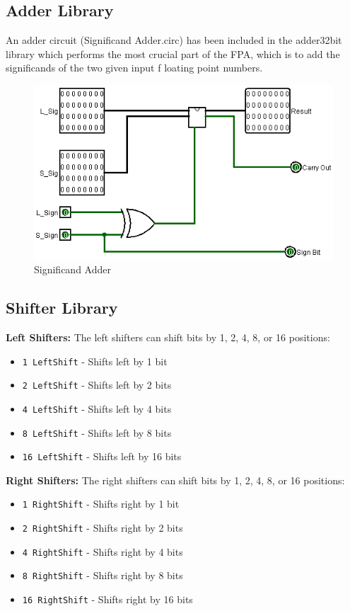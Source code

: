 \documentclass[a4paper,12pt]{article}
\begin{document}
\subsection{Adder Library}
An adder circuit (Significand Adder.circ) has been included in the adder32bit library which performs
 the most crucial part of the FPA, which is to add the significands of the two given input
 f
 loating point numbers.
\begin{figure}[htbp]
    \centering
    \includegraphics[width=1\textwidth]{Significand Adder.png}
    \caption{Significand Adder}
    \label{Significand Adder}
\end{figure}


\subsection{Shifter Library}


\item[\textbf{Left Shifters:}] The left shifters can shift bits by 1, 2, 4, 8, or 16 positions:
        \begin{itemize}
            \item \texttt{1 LeftShift} - Shifts left by 1 bit
            \item \texttt{2 LeftShift} - Shifts left by 2 bits
            \item \texttt{4 LeftShift} - Shifts left by 4 bits
            \item \texttt{8 LeftShift} - Shifts left by 8 bits
            \item \texttt{16 LeftShift} - Shifts left by 16 bits
        \end{itemize}
    
    \item[\textbf{Right Shifters:}] The right shifters can shift bits by 1, 2, 4, 8, or 16 positions:
        \begin{itemize}
            \item \texttt{1 RightShift} - Shifts right by 1 bit
            \item \texttt{2 RightShift} - Shifts right by 2 bits
            \item \texttt{4 RightShift} - Shifts right by 4 bits
            \item \texttt{8 RightShift} - Shifts right by 8 bits
            \item \texttt{16 RightShift} - Shifts right by 16 bits
        \end{itemize}
    
\end{document}

